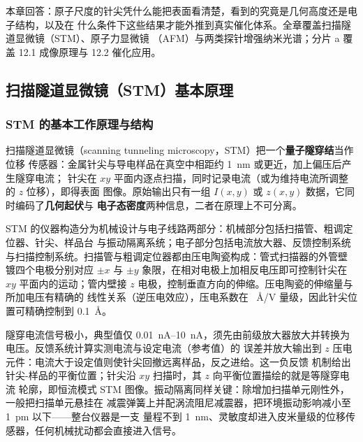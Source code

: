 
%
{本章回答：原子尺度的针尖凭什么能把表面看清楚，看到的究竟是几何高度还是电子结构，以及在
什么条件下这些结果才能外推到真实催化体系。全章覆盖扫描隧道显微镜（STM）、原子力显微镜
（AFM）与两类探针增强纳米光谱；分片 a 覆盖 12.1 成像原理与 12.2 催化应用。}
\label{ch:12}

\subsection{扫描隧道显微镜（STM）基本原理}
\label{sec:stm-principle}

\subsubsection{STM 的基本工作原理与结构}

\begin{probout}
扫描隧道显微镜（scanning tunneling microscopy，STM）把一个\textbf{量子隧穿结}当作位移
传感器：金属针尖与导电样品在真空中相距约 \qty{1}{nm} 或更近，加上偏压后产生隧穿电流；
针尖在 $xy$ 平面内逐点扫描，同时记录电流（或为维持电流所调整的 $z$ 位移），即得表面
图像。原始输出只有一组 $I(x,y)$ 或 $z(x,y)$ 数据，它同时编码了\textbf{几何起伏}与
\textbf{电子态密度}两种信息，二者在原理上不可分离。
\end{probout}

STM 的仪器构造分为机械设计与电子线路两部分：机械部分包括扫描管、粗调定位器、针尖、样品台
与振动隔离系统；电子部分包括电流放大器、反馈控制系统与扫描控制系统。扫描管与粗调定位器都由压电陶瓷构成：管式扫描器的外管壁
镀四个电极分别对应 $\pm x$ 与 $\pm y$ 象限，在相对电极上加相反电压即可控制针尖在 $xy$
平面内的运动；管内壁接 $z$ 电极，控制垂直方向的伸缩。压电陶瓷的伸缩量与所加电压有精确的
线性关系（逆压电效应），压电系数在 \qty{}{\angstrom/V} 量级，因此针尖位置可精确控制到
\qty{0.1}{\angstrom}。

隧穿电流信号极小，典型值仅 \qtyrange{0.01}{10}{nA}，须先由前级放大器放大并转换为电压。反馈系统计算实测电流与设定电流（参考值）的
误差并放大输出到 $z$ 压电元件：电流大于设定值则使针尖回撤远离样品，反之进给。这一负反馈
机制给出针尖-样品的平衡位置；针尖沿 $xy$ 扫描时，其 $z$ 向平衡位置描绘的就是等隧穿电流
轮廓，即恒流模式 STM 图像。振动隔离同样关键：除增加扫描单元刚性外，一般把扫描单元悬挂在
减震弹簧上并配涡流阻尼减震器，把环境振动影响减小至 \qty{1}{pm} 以下——整台仪器是一支
量程不到 \qty{1}{nm}、灵敏度却进入皮米量级的位移传感器，任何机械扰动都会直接进入信号。

